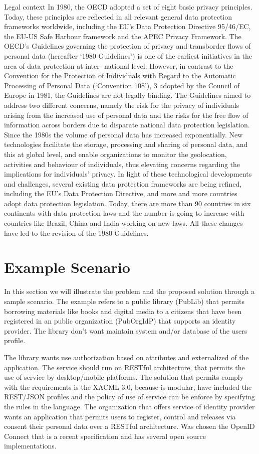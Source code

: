 \documentclass{doublecol-new}
\begin{document}
\cite{kuschewsky2014new}
Legal context
In 1980, the OECD adopted a set of eight basic privacy principles. Today, these principles are reflected in all relevant general data protection frameworks worldwide, including the EU’s Data Protection Directive 95/46/EC, the EU-US Safe Harbour framework and the APEC Privacy Framework. The OECD’s Guidelines governing the protection of privacy and transborder flows of
personal data (hereafter ‘1980 Guidelines’) is one of the earliest initiatives in the area of data protection at inter-
national level. However, in contrast to the Convention for the Protection of Individuals with Regard to the Automatic Processing of Personal Data (‘Convention 108’), 3 adopted by the Council of Europe in 1981, the Guidelines are not legally binding. The Guidelines aimed to address two different concerns, namely the risk for the privacy of individuals arising from the increased use of personal data and the risks for the free flow of information across borders due to disparate national data protection legislation. Since the 1980s the volume of personal data has increased exponentially. New technologies facilitate the storage, processing and sharing of personal data, and this at global level, and enable organizations to monitor the geolocation, activities and behaviour of individuals, thus elevating concerns regarding the implications for individuals’ privacy. In light of these technological developments and challenges, several existing data protection frameworks are being refined, including the EU’s Data Protection Directive, and more and more countries adopt data protection legislation. Today, there are more than 90 countries in six continents with data protection laws and the number is going to increase with countries like Brazil, China and India working on new laws. All these changes have led to the revision of the 1980 Guidelines.


\section{Example Scenario}

In this section we will illustrate the problem and the proposed solution through a sample scenario. The example refers to a public library (PubLib) that permits borrowing materials like books and digital media to a citizens that have been registered in an public organization (PubOrgIdP) that supports an identity provider. The library don't want maintain system and/or database of the users profile.

The library wants use authorization based on attributes and externalized of the application. The service should run on RESTful architecture, that permits the use of service by desktop/mobile platforms. The solution that permits comply with the requirements is the XACML 3.0, because is modular, have included the REST/JSON profiles and the policy of use of service can be enforce by specifying the rules in the language. The organization that offers service of identity provider wants an application that permits users to register, control and releases via consent their personal data over a RESTful architecture. Was chosen the OpenID Connect that is a recent specification and has several open source implementations.
\end{document}
